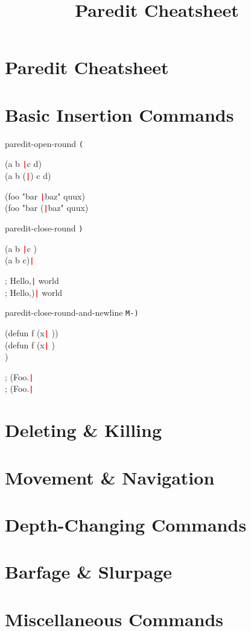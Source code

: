\documentclass[landscape,a4paper]{article}
\title{Paredit Cheatsheet}
\begin{document}
  \newcommand{\cursor}{\texttt{\textcolor{red}{\textbf{|}}}}

  \begin{multicols}{4}

    \section*{\LARGE{Paredit Cheatsheet}}

    \section*{Basic Insertion Commands}

paredit-open-round \texttt{(}

\ttfamily
(a b \cursor c d)\\
(a b (\cursor) c d)

(foo "bar \cursor baz" quux)\\
(foo "bar (\cursor baz" quux)
\rmfamily

paredit-close-round \texttt{)}

\ttfamily
(a b \cursor c \space\space)\\
(a b c)\cursor

; Hello,\cursor{} world\\
; Hello,)\cursor{} world
\rmfamily

paredit-close-round-and-newline \texttt{M-)}

\ttfamily
(defun f (x\cursor{} \space))\\
(defun f (x\cursor{} \space)\\
)

; (Foo.\cursor\\
; (Foo.\cursor
\rmfamily

    \section*{Deleting \& Killing}

    \section*{Movement \& Navigation}

    \section*{Depth-Changing Commands}

    \section*{Barfage \& Slurpage}

    \section*{Miscellaneous Commands}

  \end{multicols}
\end{document}

